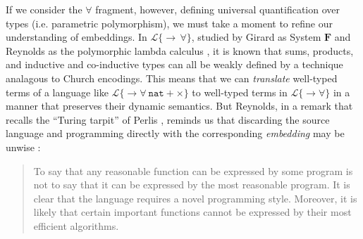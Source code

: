 If we consider the $\forall$ fragment, however, defining universal quantification over types (i.e. parametric polymorphism), we must take a moment to refine our understanding of embeddings. In $\mathcal{L}\{\rightarrow\,\forall\}$, studied by Girard as System $\mathbf{F}$ \cite{girard1971extension} and Reynolds as the polymorphic lambda calculus \cite{Reynolds94anintroduction}, it is known that sums, products, and inductive and co-inductive types can all be weakly defined by a technique analagous to Church encodings. This means that we can \emph{translate} well-typed terms of a language like $\mathcal{L}\{\rightarrow\forall~\mathtt{nat} + \times\}$ to well-typed terms in $\mathcal{L}\{\rightarrow\forall\}$ in a manner that preserves their dynamic semantics. But Reynolds, in a remark that recalls the ``Turing tarpit'' of Perlis \cite{Perl82a}, reminds us that discarding the source language and programming directly with the corresponding \emph{embedding} may be unwise \cite{Reynolds94anintroduction}: 
\begin{quote}
To say that any reasonable function can be expressed by some program is not to say that it can be expressed by the most reasonable program. It is clear that the language requires a novel programming style. Moreover, it is likely that certain important functions cannot be expressed by their most efficient algorithms.
\end{quote}

%

